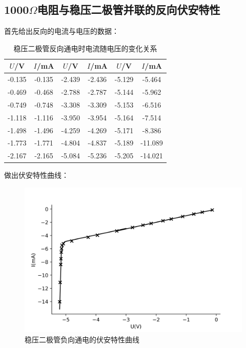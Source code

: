 \documentclass[a4paper]{ctexart}
\begin{document}
	\subsection{1000$\Omega$电阻与稳压二极管并联的反向伏安特性}
		\par 
		首先给出反向的电流与电压的数据：
		\begin{table}[htbp]
			\centering
			\caption{稳压二极管反向通电时电流随电压的变化关系}
			\label{diode&r_relation-}
			\begin{tabular}{cc|cc|cc}
				\toprule
				$U$/V & $I$/mA & $U$/V & $I$/mA & $U$/V & $I$/mA\\
				\midrule
				-0.135 & -0.135 & -2.439 & -2.436 & -5.129 & -5.464 \\
				-0.469 & -0.468 & -2.788 & -2.787 & -5.144 & -5.962 \\
				-0.749 & -0.748 & -3.308 & -3.309 & -5.153 & -6.516 \\
				-1.118 & -1.116 & -3.950 & -3.954 & -5.164 & -7.514 \\
				-1.498 & -1.496 & -4.259 & -4.269 & -5.171 & -8.386 \\
				-1.773 & -1.771 & -4.804 & -4.837 & -5.189 & -11.089 \\
				-2.167 & -2.165 & -5.084 & -5.236 & -5.205 & -14.021 \\
				\bottomrule
			\end{tabular}
		\end{table}
		\par 
		做出伏安特性曲线：
		\begin{figure}[htbp]
			\centering
			\includegraphics[scale=0.65]{diode&r_curve-}
			\caption{稳压二极管负向通电的伏安特性曲线}
			\label{diode&r_curve-}
		\end{figure}
\end{document}
